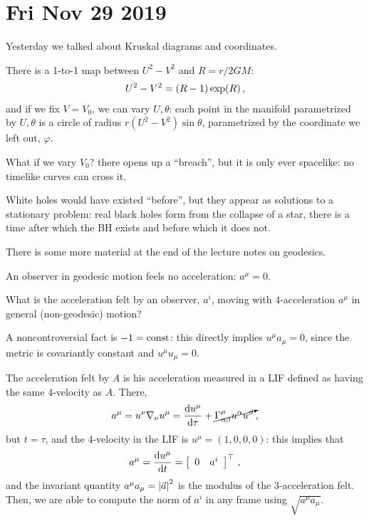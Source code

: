 \documentclass[main.tex]{subfiles}
\begin{document}
\section*{Fri Nov 29 2019}

Yesterday we talked about Kruskal diagrams and coordinates. 

There is a 1-to-1 map between \(U^2 - V^2\) and \(R = r/2GM\): 
%
\begin{align}
  U^2 - V^2 = \qty(R-1) \exp(R)
\,,
\end{align}
%
and if we fix \(V = V_0 \), we can vary \(U, \theta \): each point in the manifold parametrized by \(U, \theta \) is a circle of radius \(r(U^2-V^2) \sin \theta \), parametrized by the coordinate we left out, \(\varphi \). 

What if we vary \(V_0 \)? there opens up a ``breach'', but it is only ever spacelike: no timelike curves can cross it. 

White holes would have existed ``before'', but they appear as solutions to a stationary problem: real black holes form from the collapse of a star, there is a time after which the BH exists and before which it does not. 

There is some more material at the end of the lecture notes on geodesics. 

An observer in geodesic motion feels no acceleration: \(a^{\mu } = 0\). 

What is the acceleration felt by an observer, \(a^{i}\), moving with \(4\)-acceleration \(a^{\mu }\) in general (non-geodesic) motion? 

A noncontroversial fact is \(-1 = \text{const}\): this directly implies \(u^{\mu } a_{\mu } = 0\), since the metric is covariantly constant and \(u^{\mu } u_{\mu } = 0\). 

The acceleration felt by \(A\) is his acceleration measured in a LIF defined as having the same \(4\)-velocity as \(A\). There, 
%
\begin{align}
  a^{\mu } = u^{\nu } \nabla_{\nu } u^{\mu } = \dv{ u^{\mu }}{\tau } + \cancelto{}{\Gamma^{\mu }_{\alpha \beta } u^{\alpha } u^{\beta }}
\,,
\end{align}
%
but \(t = \tau \), and the 4-velocity in the LIF is \(u^{\mu } = (1, 0,0,0)\): this implies that 
%
\begin{align}
  a^{ \mu } = \dv{ u^{\mu }}{t} = \left[\begin{array}{cc}
  0 & a^{i}
  \end{array}\right]^{\top}
\,,
\end{align}
%
and the invariant quantity \(a^{\mu } a_{\mu } = \abs{\vec{a}}^{2}\) is the modulus of the 3-acceleration felt. 
Then, we are able to compute the norm of \(a^{i}\) in any frame using \(\sqrt{a^{\mu } a_{\mu }}\). 
\end{document}
